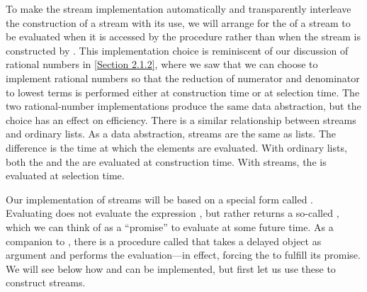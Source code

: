 To make the stream implementation automatically and transparently interleave the construction of a stream with its use, we will arrange for the  of a stream to be evaluated when it is accessed by the  procedure rather than when the stream is constructed by .
This implementation choice is reminiscent of our discussion of rational numbers in \cref{Section 2.1.2}, where we saw that we can choose to implement rational numbers so that the reduction of numerator and denominator to lowest terms is performed either at construction time or at selection time.
The two rational-number implementations produce the same data abstraction, but the choice has an effect on efficiency.
There is a similar relationship between streams and ordinary lists.
As a data abstraction, streams are the same as lists.
The difference is the time at which the elements are evaluated.
With ordinary lists, both the  and the  are evaluated at construction time.
With streams, the  is evaluated at selection time.

Our implementation of streams will be based on a special form called .
Evaluating  does not evaluate the expression , but rather returns a so-called , which we can think of as a “promise” to evaluate  at some future time.
As a companion to , there is a procedure called  that takes a delayed object as argument and performs the evaluation---in effect, forcing the  to fulfill its promise.
We will see below how  and  can be implemented, but first let us use these to construct streams.

